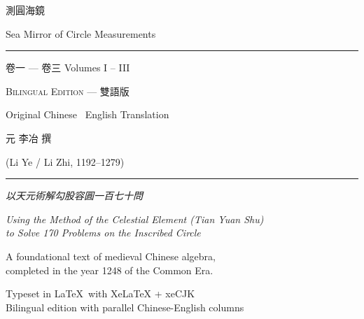 \documentclass[11pt,a4paper]{article}
\begin{document}
\begin{titlepage}
\centering
\vspace*{2cm}

{\fontsize{36}{44}\selectfont{}\color{titlecolor}
測圓海鏡}

\vspace{0.8cm}

{\fontsize{18}{22}\selectfont\color{sectioncolor}
Sea Mirror of Circle Measurements}

\vspace{0.5cm}

{\large\color{rulecolor}\rule{0.6\textwidth}{0.4pt}}

\vspace{0.8cm}

{\LARGE 卷一 — 卷三 \quad\textbar\quad Volumes I – III}

\vspace{0.5cm}

{\large\color{sectioncolor}
\textsc{Bilingual Edition} — 雙語版}

\vspace{0.3cm}

{\normalsize\color{notecolor}
Original Chinese \textbullet\ English Translation}

\vspace{1.5cm}

{\large\color{sectioncolor}
元 \quad 李冶 \quad 撰}

\vspace{0.3cm}

{\normalsize\color{sectioncolor}
(Li Ye / Li Zhi, 1192–1279)}

\vspace{2cm}

{\color{rulecolor}\rule{0.4\textwidth}{0.4pt}}

\vspace{1cm}

{\normalsize
\textit{以天元術解勾股容圓一百七十問}}

\vspace{0.3cm}

{\small\color{notecolor}
\textit{Using the Method of the Celestial Element (Tian Yuan Shu)}\\
\textit{to Solve 170 Problems on the Inscribed Circle}}

\vspace{1.5cm}

{\small
A foundational text of medieval Chinese algebra,\\
completed in the year 1248 of the Common Era.
}

\vfill

{\small Typeset in \LaTeX\ with XeLaTeX + xeCJK\\
Bilingual edition with parallel Chinese-English columns}

\end{titlepage}
\end{document}
